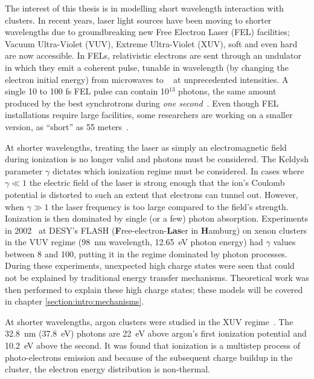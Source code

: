 The interest of this thesis is in modelling short wavelength interaction with
clusters. In recent years, laser light sources have been moving to shorter
wavelengths due to groundbreaking new Free Electron Laser (FEL)
facilities; Vacuum Ultra-Violet (VUV), Extreme Ultra-Violet (XUV), soft \xrays
and even hard \xrays are now accessible. In FELs, relativistic electrons are sent
through an undulator in which they emit a coherent pulse, tunable in wavelength
(by changing the electron initial energy)
from microwaves to \xrays~\cite{Brabec2009,Ackermann2007a,Pellegrini2012} at
unprecedented intensities. A single 10 to 100 fs FEL pulse can contain 10$^{13}$
photons, the same amount produced by the best synchrotrons during
\textit{one second}~\cite{Bostedt2009}. Even though FEL installations require
large facilities, some researchers are working on a smaller version, as
``short'' as 55 meters~\cite{Shintake2008}.

At shorter wavelengths, treating the laser as simply an electromagnetic field
during ionization is no longer valid and photons must be considered.
The Keldysh parameter $\gamma$ dictates which ionization regime must be considered. In
cases where $\gamma \ll 1$ the electric field of the laser is strong enough that
the ion's Coulomb potential is distorted to such an extent
that electrons can tunnel out.
However, when $\gamma \gg 1$ the laser frequency is too large compared to the
field's strength. Ionization is then dominated by single (or a few) photon
absorption.
Experiments in
2002~\cite{Wabnitz2002,Bostedt2009} at
DESY's FLASH (\textbf{F}ree-electron-\textbf{Las}er in \textbf{H}amburg)
on xenon clusters in the VUV regime (98~nm wavelength, 12.65~eV photon energy)
had $\gamma$ values between 8 and
100, putting it in the regime dominated by photon processes.
During these experiments, unexpected high charge states were seen that could not
be explained by traditional energy transfer mechanisms. Theoretical work was
then performed to explain these high charge states; these models will be
covered in chapter \ref{section:intro:mechanisms}.



At shorter wavelengths,
argon clusters were studied in the XUV regime~\cite{Bostedt2008}. The 32.8~nm
(37.8~eV) photons are 22~eV above argon's first ionization
potential and 10.2~eV  above the second. It was found that ionization is a multistep process of
photo-electrons emission and because of the subsequent charge buildup in the
cluster, the electron energy distribution is non-thermal.

